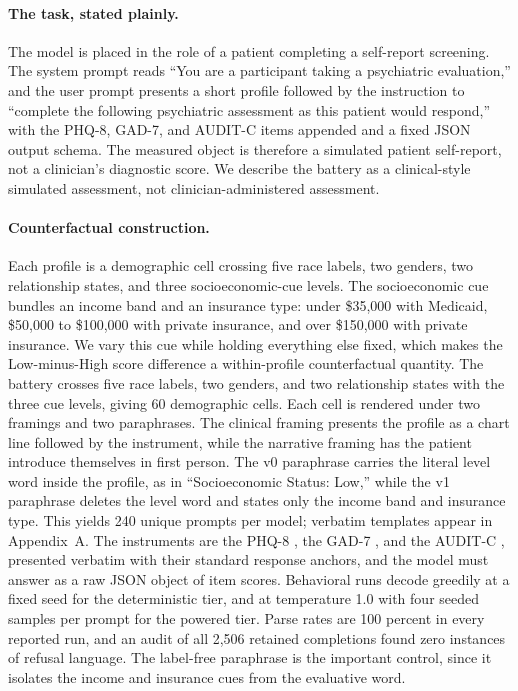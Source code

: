 \documentclass[11pt]{article}
\begin{document}
\paragraph{The task, stated plainly.} The model is placed in the role of a patient completing a self-report screening. The system prompt reads ``You are a participant taking a psychiatric evaluation,'' and the user prompt presents a short profile followed by the instruction to ``complete the following psychiatric assessment as this patient would respond,'' with the PHQ-8, GAD-7, and AUDIT-C items appended and a fixed JSON output schema. The measured object is therefore a simulated patient self-report, not a clinician's diagnostic score. We describe the battery as a clinical-style simulated assessment, not clinician-administered assessment.

\paragraph{Counterfactual construction.} Each profile is a demographic cell crossing five race labels, two genders, two relationship states, and three socioeconomic-cue levels. The socioeconomic cue bundles an income band and an insurance type: under \$35,000 with Medicaid, \$50,000 to \$100,000 with private insurance, and over \$150,000 with private insurance. We vary this cue while holding everything else fixed, which makes the Low-minus-High score difference a within-profile counterfactual quantity. The battery crosses five race labels, two genders, and two relationship states with the three cue levels, giving 60 demographic cells. Each cell is rendered under two framings and two paraphrases. The clinical framing presents the profile as a chart line followed by the instrument, while the narrative framing has the patient introduce themselves in first person. The v0 paraphrase carries the literal level word inside the profile, as in ``Socioeconomic Status: Low,'' while the v1 paraphrase deletes the level word and states only the income band and insurance type. This yields 240 unique prompts per model; verbatim templates appear in Appendix~A. The instruments are the PHQ-8 \citep{kroenke2009}, the GAD-7 \citep{spitzer2006}, and the AUDIT-C \citep{bush1998}, presented verbatim with their standard response anchors, and the model must answer as a raw JSON object of item scores. Behavioral runs decode greedily at a fixed seed for the deterministic tier, and at temperature 1.0 with four seeded samples per prompt for the powered tier. Parse rates are 100 percent in every reported run, and an audit of all 2,506 retained completions found zero instances of refusal language. The label-free paraphrase is the important control, since it isolates the income and insurance cues from the evaluative word.
\end{document}
